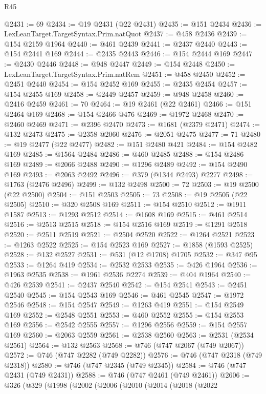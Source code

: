 \begin{lexlean}{R45}
\begin{coremodule}
@2431 := 69
@2434 := @19 @2431 (@22 @2431)
@2435 := @151 @2434
@2436 := LexLeanTarget.TargetSyntax.Prim.natQuot
@2437 := @458 @2436
@2439 := @154 @2159 @1964
@2440 := @461 @2439
@2441 := @2437 @2440
@2443 := @154 @2441 @169
@2444 := @2435 @2443
@2446 := @154 @2444 @169
@2447 := @2430 @2446
@2448 := @948 @2447
@2449 := @154 @2448
@2450 := LexLeanTarget.TargetSyntax.Prim.natRem
@2451 := @458 @2450
@2452 := @2451 @2440
@2454 := @154 @2452 @169
@2455 := @2435 @2454
@2457 := @154 @2455 @169
@2458 := @2449 @2457
@2459 := @948 @2458
@2460 := @2416 @2459
@2461 := 70
@2464 := @19 @2461 (@22 @2461)
@2466 := @151 @2464 @169
@2468 := @154 @2466 @476
@2469 := @1972 @2468
@2470 := @2460 @2469
@2471 := @2396 @2470
@2473 := @1681 (@2379 @2471)
@2474 := @132 @2473
@2475 := @2358 @2060
@2476 := @2051 @2475
@2477 := 71
@2480 := @19 @2477 (@22 @2477)
@2482 := @151 @2480 @421
@2484 := @154 @2482 @169
@2485 := @1564 @2484
@2486 := @460 @2485
@2488 := @154 @2486 @169
@2489 := @2066 @2488
@2490 := @1296 @2489
@2492 := @154 @2490 @169
@2493 := @2063 @2492
@2496 := @379 (@1344 @2493) @2277
@2498 := @1763 (@2476 @2496)
@2499 := @132 @2498
@2500 := 72
@2503 := @19 @2500 (@22 @2500)
@2504 := @151 @2503
@2505 := 73
@2508 := @19 @2505 (@22 @2505)
@2510 := @320 @2508 @169
@2511 := @154 @2510
@2512 := @1911 @1587
@2513 := @1293 @2512
@2514 := @1608 @169
@2515 := @461 @2514
@2516 := @2513 @2515
@2518 := @154 @2516 @169
@2519 := @1291 @2518
@2520 := @2511 @2519
@2521 := @2504 @2520
@2522 := @1264 @2521
@2523 := @1263 @2522
@2525 := @154 @2523 @169
@2527 := @1858 (@1593 @2525)
@2528 := @132 @2527
@2531 := @531 (@12 @1708) @1705
@2532 := @347 @95
@2533 := @1264 @419
@2534 := @2532 @2533
@2535 := @426 @1964
@2536 := @1963 @2535
@2538 := @1961 @2536 @2274
@2539 := @404 @1964
@2540 := @426 @2539
@2541 := @2437 @2540
@2542 := @154 @2541
@2543 := @2451 @2540
@2545 := @154 @2543 @169
@2546 := @461 @2545
@2547 := @1972 @2546
@2548 := @154 @2547
@2549 := @1263 @419
@2551 := @154 @2549 @169
@2552 := @2548 @2551
@2553 := @460 @2552
@2555 := @154 @2553 @169
@2556 := @2542 @2555
@2557 := @1296 @2556
@2559 := @154 @2557 @169
@2560 := @2063 @2559
@2561 := @2538 @2560
@2563 := @2531 (@2534 @2561)
@2564 := @132 @2563
@2568 := @746 (@747 @2067 (@749 @2067))
@2572 := @746 (@747 @2282 (@749 @2282))
@2576 := @746 (@747 @2318 (@749 @2318))
@2580 := @746 (@747 @2345 (@749 @2345))
@2584 := @746 (@747 @2431 (@749 @2431))
@2588 := @746 (@747 @2461 (@749 @2461))
@2606 := @326
    (@329
      (@1998
        (@2002
          (@2006
            (@2010
              (@2014
                (@2018
                  (@2022

\end{coremodule}
\end{lexlean}
